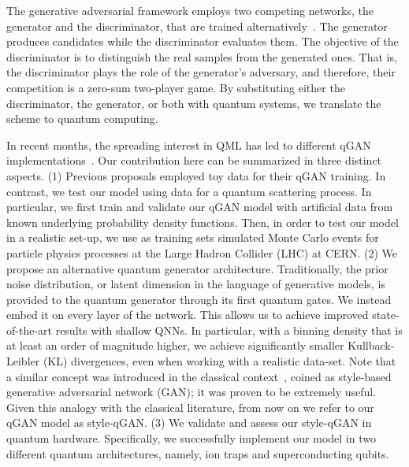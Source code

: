 \documentclass[twocolumn,preprintnumbers,superscriptaddress]{revtex4-2}
\begin{document}
The generative adversarial framework employs two competing networks, the generator and the discriminator, that are
trained alternatively~\cite{goodfellow2014generative}. The generator produces candidates
while the discriminator evaluates them. The objective of the discriminator is to
distinguish the real samples from the generated ones. That is, the discriminator
plays the role of the generator's adversary, and therefore, their competition is
a zero-sum two-player game. By substituting either the discriminator, the
generator, or both with quantum systems, we translate the scheme to quantum
computing.

In recent months, the spreading interest in QML has led to different qGAN
implementations~\cite{zoufal2019quantum, zeng2019learning, situ2020quantum, hu2019quantum, benedetti2019adversarial, romero2021variational, niu2021entangling}. Our contribution here can be summarized in three distinct aspects. (1) Previous proposals employed toy data for their qGAN training. In contrast, we test our model using data for a quantum scattering process. In particular, we first train and validate our qGAN model with artificial data from known underlying probability density functions. Then, in order to test our model in a realistic set-up, we use as training sets simulated Monte Carlo events for particle physics processes at the Large Hadron Collider (LHC) at CERN. (2) We propose an alternative quantum generator architecture. Traditionally, the prior noise distribution, or latent dimension in the language of generative models, is provided to the quantum generator through its first quantum gates. We instead embed it on every layer of the network. This allows us to achieve improved state-of-the-art results with shallow QNNs. In particular, with a binning density that is at least an order of magnitude higher, we achieve significantly smaller Kullback-Leibler (KL) divergences, even when working with a realistic data-set. Note that a similar concept was introduced in the classical context~\cite{karras2019style}, coined as style-based generative adversarial network (GAN); it was proven to be extremely useful. Given this analogy with the classical literature, from now on we refer to our qGAN model as style-qGAN. (3) We validate and assess our style-qGAN in quantum hardware. Specifically, we successfully implement our model in two different quantum architectures, namely, ion traps and superconducting qubits.
\end{document}

